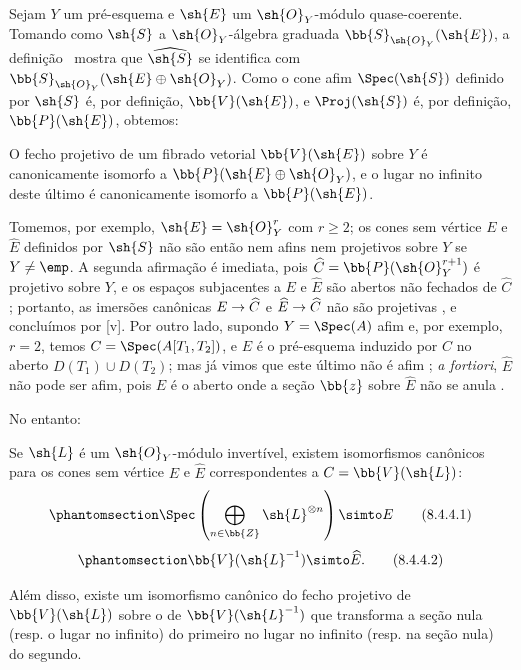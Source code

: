 \documentclass[oneside,10pt]{amsart}
\makeatletter
\renewcommand{\geq}{\geqslant}
\newcommand{\ega@arrow}[2]{\mathchoice{#1}{#2}{#2}{#2}}
\renewcommand{\to}{\ega@arrow{\longrightarrow}{\rightarrow}}
\let\EGAOriginalLabel\label
\renewcommand{\label}[1]{\phantomsection\EGAOriginalLabel{#1}}
\makeatother
\begin{document}
\begin{env}[8.4.1]
\label{II.8.4.1}
Sejam $Y$ um pré-esquema e $\sh{E}$ um $\sh{O}_Y$-módulo quase-coerente.
Tomando como $\sh{S}$ a $\sh{O}_Y$-álgebra graduada $\bb{S}_{\sh{O}_Y}(\sh{E})$, a definição~ mostra que $\widehat{\sh{S}}$ se identifica com $\bb{S}_{\sh{O}_Y}(\sh{E}\oplus\sh{O}_Y)$.
Como o cone afim $\Spec(\sh{S})$ definido por $\sh{S}$ é, por definição, $\bb{V}(\sh{E})$, e $\Proj(\sh{S})$ é, por definição, $\bb{P}(\sh{E})$, obtemos:
\end{env}
\begin{proposition}[8.4.2]
\label{II.8.4.2}
O fecho projetivo de um fibrado vetorial $\bb{V}(\sh{E})$ sobre $Y$ é canonicamente isomorfo a $\bb{P}(\sh{E}\oplus\sh{O}_Y)$, e o lugar no infinito deste último é canonicamente isomorfo a $\bb{P}(\sh{E})$.
\end{proposition}
\begin{remark}[8.4.3]
\label{II.8.4.3}
Tomemos, por exemplo, $\sh{E}=\sh{O}_Y^r$ com $r\geq2$;
os cones sem vértice $E$ e $\widehat{E}$ definidos por $\sh{S}$ não são então nem afins nem projetivos sobre $Y$ se $Y\neq\emp$.
A segunda afirmação é imediata, pois $\widehat{C}=\bb{P}(\sh{O}_Y^{r+1})$ é projetivo sobre $Y$, e os espaços subjacentes a $E$ e $\widehat{E}$ são abertos não fechados de $\widehat{C}$; portanto, as imersões canônicas $E\to\widehat{C}$ e $\widehat{E}\to\widehat{C}$ não são projetivas , e concluímos por [v].
Por outro lado, supondo $Y=\Spec(A)$ afim e, por exemplo, $r=2$, temos $C=\Spec(A[T_1,T_2])$, e $E$ é o pré-esquema induzido por $C$ no aberto $D(T_1)\cup D(T_2)$;
mas já vimos que este último não é afim ;
\emph{a fortiori}, $\widehat{E}$ não pode ser afim, pois $E$ é o aberto onde a seção $\bb{z}$ sobre $\widehat{E}$ não se anula .

No entanto:
\end{remark}
\begin{proposition}[8.4.4]
\label{II.8.4.4}
Se $\sh{L}$ é um $\sh{O}_Y$-módulo invertível, existem isomorfismos canônicos para os cones sem vértice $E$ e $\widehat{E}$ correspondentes a $C=\bb{V}(\sh{L})$:
\[
\label{eq:2.8.4.4.1}
  \Spec\left(
    \bigoplus_{n\in\bb{Z}}\sh{L}^{\otimes n}
  \right)
  \simto
  E
\tag{8.4.4.1}
\]
\[
\label{eq:2.8.4.4.2}
  \bb{V}(\sh{L}^{-1})
  \simto
  \widehat{E}.
\tag{8.4.4.2}
\]

Além disso, existe um isomorfismo canônico do fecho projetivo de $\bb{V}(\sh{L})$ sobre o de $\bb{V}(\sh{L}^{-1})$ que transforma a seção nula (resp. o lugar no infinito) do primeiro no lugar no infinito (resp. na seção nula) do segundo.
\end{proposition}
\end{document}
